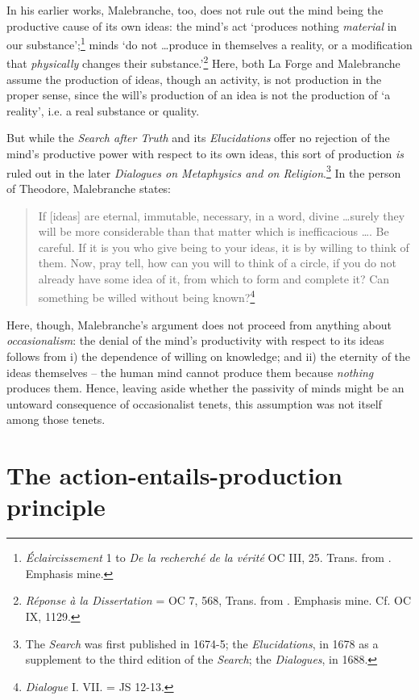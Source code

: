 In his earlier works, Malebranche, too, does not rule out the mind being the productive cause of its own ideas: the mind's act `produces nothing \emph{material} in our substance';\footnote{\emph{Éclaircissement} 1 to \emph{De la recherché de la vérité} OC III, 25. Trans. from \autocite[52]{Nadler2005}. Emphasis mine.} minds `do not \ldots produce in themselves a reality, or a modification that \emph{physically} changes their substance.'\footnote{\emph{Réponse à la Dissertation} = OC 7, 568, Trans. from \autocite[52]{Nadler2005}. Emphasis mine. Cf. OC IX, 1129.} Here, both La Forge and Malebranche assume the production of ideas, though an activity, is not production in the proper sense, since the will's production of an idea is not the production of `a reality', i.e. a real substance or quality.

But while the \emph{Search after Truth} and its \emph{Elucidations} offer no rejection of the mind's productive power with respect to its own ideas, this sort of production \emph{is} ruled out in the later \emph{Dialogues on Metaphysics and on Religion}.\footnote{The \emph{Search} was first published in 1674-5; the \emph{Elucidations}, in 1678 as a supplement to the third edition of the \emph{Search}; the \emph{Dialogues}, in 1688.} In the person of Theodore, Malebranche states:

\begin{quote}
	If [ideas] are eternal, immutable, necessary, in a word, divine \ldots surely they will be more considerable than that matter which is inefficacious \ldots. Be careful. If it is you who give being to your ideas, it is by willing to think of them. Now, pray tell, how can you will to think of a circle, if you do not already have some idea of it, from which to form and complete it? Can something be willed without being known?\footnote{\emph{Dialogue} I. VII. = JS 12-13.}
\end{quote}

Here, though, Malebranche's argument does not proceed from anything about \emph{occasionalism}: the denial of the mind's productivity with respect to its ideas follows from i) the dependence of willing on knowledge; and ii) the eternity of the ideas themselves -- the human mind cannot produce them because \emph{nothing} produces them. Hence, leaving aside whether the passivity of minds might be an untoward consequence of occasionalist tenets, this assumption was not itself among those tenets.

\section{The action-entails-production principle}
